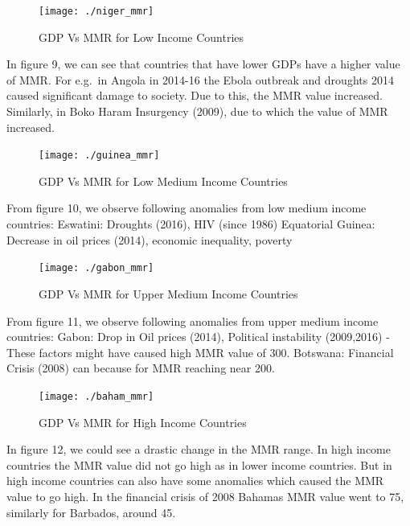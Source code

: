 \documentclass[
]{article}
\begin{document}
\begin{figure}[H]

{\centering \texttt{[image: ./niger\_mmr]} 

}

\caption{GDP Vs MMR for Low Income Countries}\label{fig:plot9}
\end{figure}

In figure 9, we can see that countries that have lower GDPs have a
higher value of MMR. For e.g.~in Angola in 2014-16 the Ebola outbreak
and droughts 2014 caused significant damage to society. Due to this, the
MMR value increased. Similarly, in Boko Haram Insurgency (2009), due to
which the value of MMR increased.

\begin{figure}[H]

{\centering \texttt{[image: ./guinea\_mmr]} 

}

\caption{GDP Vs MMR for Low Medium Income Countries}\label{fig:plot10}
\end{figure}

From figure 10, we observe following anomalies from low medium income
countries: Eswatini: Droughts (2016), HIV (since 1986) Equatorial
Guinea: Decrease in oil prices (2014), economic inequality, poverty

\begin{figure}[H]

{\centering \texttt{[image: ./gabon\_mmr]} 

}

\caption{GDP Vs MMR for Upper Medium Income Countries}\label{fig:plot11}
\end{figure}

From figure 11, we observe following anomalies from upper medium income
countries: Gabon: Drop in Oil prices (2014), Political instability
(2009,2016) - These factors might have caused high MMR value of 300.
Botswana: Financial Crisis (2008) can because for MMR reaching near 200.

\begin{figure}[H]

{\centering \texttt{[image: ./baham\_mmr]} 

}

\caption{GDP Vs MMR for High Income Countries}\label{fig:plot12}
\end{figure}

In figure 12, we could see a drastic change in the MMR range. In high
income countries the MMR value did not go high as in lower income
countries. But in high income countries can also have some anomalies
which caused the MMR value to go high. In the financial crisis of 2008
Bahamas MMR value went to 75, similarly for Barbados, around 45.
\end{document}
